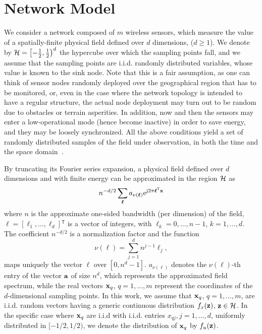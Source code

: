 \documentclass[11pt, draftcls, onecolumn, a4paper]{IEEEtran}
\newcommand{\ee}{{\rm e}}
\newcommand{\jj}{{\rm j}}  \newcommand{\ii}{{\rm i}}  \newcommand{\dd}{{\rm\,d}}
\newcommand{\av}{{\bf a}}
\newcommand{\ellv}{\boldsymbol{\ell}}
\newcommand{\xv}{{\bf x}}
\newcommand{\zv}{{\bf z}}
\newcommand{\Hc}{{\cal H}}
\def\Tran{\mathsf{^T}}
\begin{document}
\section{Network Model\label{sec:system}}

We consider a network composed of $m$ wireless sensors, which measure
the value of a spatially-finite physical field defined over $d$
dimensions, ($d \ge 1$).  We denote by
$\Hc=\left[-\frac{1}{2},\frac{1}{2}\right)^d$ the hypercube over which
  the sampling points fall, and we assume that the sampling points are
  i.i.d. randomly distributed variables, whose value is known to the
  sink node.  Note that this is a fair assumption, as one can think of
  sensor nodes randomly deployed over the geographical region that has
  to be monitored, or, even in the case where the network topology is
  intended to have a regular structure, the actual node deployment may
  turn out to be random due to obstacles or terrain asperities.  In
  addition, now and then the sensors may enter a low-operational mode
  (hence become inactive) in order to save energy, and they may be
  loosely synchronized.  All the above conditions yield a set of
  randomly distributed samples of the field under observation, in both
  the time and the space domain~\cite{Ganesan03}.


By truncating its Fourier series expansion, a physical field defined
over $d$ dimensions and with finite energy can be approximated in the
region $\Hc$ as \cite{TSP2}
  \begin{equation}
  \label{eq:blsig}
n^{-d/2}\sum_{\ellv}
  a_{\nu(\ellv)} \ee^{\jj 2\pi \ellv\Tran \xv }
   \end{equation}
where $n$ is the approximate one-sided bandwidth (per dimension) of
the field, $\ellv=[\ell_1,\ldots,\ell_d]\Tran$ is a vector of
integers, with $\ell_k=0,\ldots,n-1$, $k=1,\ldots,d$. The coefficient
$n^{-d/2}$ is a normalization factor and the function
\[\nu(\ellv) = \sum_{j=1}^d n^{j-1} \ell_j,\]
maps uniquely the vector $\ellv$ over $[0,n^d-1]$.  
$a_{\nu(\ellv)}$ denotes the  $\nu(\ellv)$-th entry of the 
vector $\av$ of size $n^d$, which represents the approximated field spectrum, 
while the real vectors $\xv_q$, $q=1,\ldots,m$
represent the coordinates of the $d$-dimensional sampling points. In
this work, we assume that $\xv_q$, $q=1,\ldots,m$, are i.i.d. random
vectors having a generic continuous distribution $f_{x}(\zv)$,
$\zv\in \Hc$.  In the specific case where $\xv_q$ are i.i.d with i.i.d.
entries $x_{qj}, j=1,\ldots,d$, uniformly distributed in $[-1/2,1/2)$,
  we denote the distribution of $\xv_q$ by $f_u(\zv)$.
\end{document}
